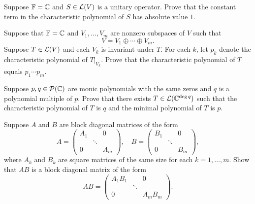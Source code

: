 \begin{exercise}
Suppose $\mathbb{F}=\mathbb{C}$ and $S\in\mathcal{L}(V)$ is a unitary operator. Prove that the
constant term in the characteristic polynomial of $S$ has absolute value $1$.
\end{exercise}

\begin{exercise}
Suppose that $\mathbb{F}=\mathbb{C}$ and $V_1,\dots,V_m$ are nonzero subspaces of $V$ such
that
\[ V = V_1\oplus\cdots\oplus V_m. \]
Suppose $T\in\mathcal{L}(V)$ and each $V_k$ is invariant under $T$. For each $k$, let
$p_k$ denote the characteristic polynomial of $T|_{V_k}$. Prove that the
characteristic polynomial of $T$ equals $p_1\cdots p_m$.
\end{exercise}

\begin{exercise}
Suppose $p,q\in\mathcal{P}(\mathbb{C})$ are monic polynomials with the same zeros and $q$ is
a polynomial multiple of $p$. Prove that there exists
$T\in\mathcal{L}(\mathbb{C}^{\deg q})$ such that the characteristic polynomial of $T$ is $q$
and the minimal polynomial of $T$ is $p$.
\end{exercise}

\begin{exercise}
Suppose $A$ and $B$ are block diagonal matrices of the form
\[ A = \begin{pmatrix} A_1 & & 0\\ & \ddots & \\ 0 & & A_m \end{pmatrix},
   \quad
   B = \begin{pmatrix} B_1 & & 0\\ & \ddots & \\ 0 & & B_m \end{pmatrix}, \]
where $A_k$ and $B_k$ are square matrices of the same size for each
$k=1,\dots,m$. Show that $AB$ is a block diagonal matrix of the form
\[ AB = \begin{pmatrix} A_1B_1 & & 0\\ & \ddots & \\ 0 & & A_mB_m
   \end{pmatrix}. \]
\end{exercise}

